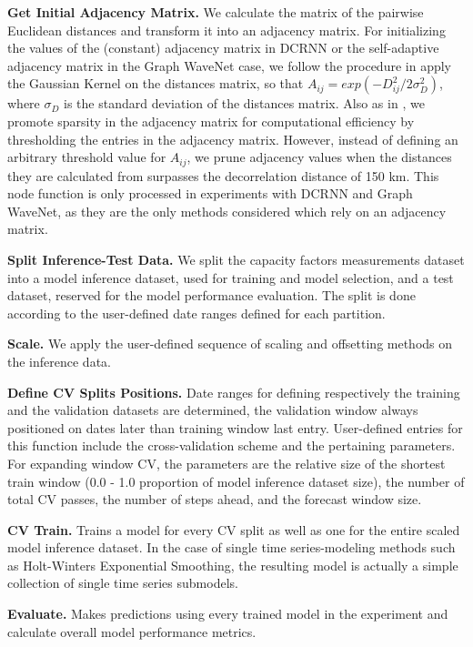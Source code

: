\vspace{1em}
\noindent
\textbf{Get Initial Adjacency Matrix.}  We calculate the matrix of the pairwise Euclidean distances and transform it into an adjacency matrix.
For initializing the values of the (constant) adjacency matrix in DCRNN or the self-adaptive adjacency matrix in the Graph WaveNet case, we follow the procedure in \cite{li2018dcrnn, wu2019graphwavenet} apply the Gaussian Kernel on the distances matrix, so that $A_{ij} = exp(-D_{ij}^2/2\sigma_{D}^2)$, where $\sigma_{D}$ is the standard deviation of the distances matrix.
Also as in \cite{li2018dcrnn}, we promote sparsity in the adjacency matrix for computational efficiency by thresholding the entries in the adjacency matrix.
However, instead of defining an arbitrary threshold value for $A_{ij}$, we prune adjacency values when the distances they are calculated from surpasses the decorrelation distance of 150 km.
This node function is only processed in experiments with DCRNN and Graph WaveNet, as they are the only methods considered which rely on an adjacency matrix.

\vspace{1em}
\noindent
\textbf{Split Inference-Test Data.}  We split the capacity factors measurements dataset into a model inference dataset, used for training and model selection, and a test dataset, reserved for the model performance evaluation.
The split is done according to the user-defined date ranges defined for each partition.

\vspace{1em}
\noindent
\textbf{Scale.}  We apply the user-defined sequence of scaling and offsetting methods on the inference data.

\vspace{1em}
\noindent
\textbf{Define CV Splits Positions.}  Date ranges for defining respectively the training and the validation datasets are determined, the validation window always positioned on dates later than training window last entry.
User-defined entries for this function include the cross-validation scheme and the pertaining parameters.
For expanding window CV, the parameters are the relative size of the shortest train window (0.0 - 1.0 proportion of model inference dataset size), the number of total CV passes, the number of steps ahead, and the forecast window size.

\vspace{1em}
\noindent
\textbf{CV Train.}  Trains a model for every CV split as well as one for the entire scaled model inference dataset.
In the case of single time series-modeling methods such as Holt-Winters Exponential Smoothing, the resulting model is actually a simple collection of single time series submodels.

\vspace{1em}
\noindent
\textbf{Evaluate.}  Makes predictions using every trained model in the experiment and calculate overall model performance metrics.